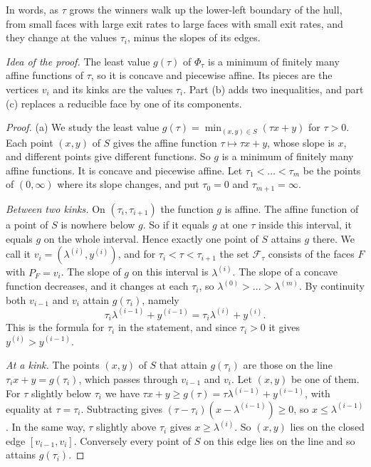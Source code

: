 In words, as $\tau$ grows the winners walk up the lower-left boundary of the
hull, from small faces with large exit rates to large faces with small exit
rates, and they change at the values $\tau_i$, minus the slopes of its edges.

\emph{Idea of the proof.} The least value $g(\tau)$ of $\Phi_\tau$ is a minimum
of finitely many affine functions of $\tau$, so it is concave and piecewise
affine. Its pieces are the vertices $v_i$ and its kinks are the values
$\tau_i$. Part (b) adds two inequalities, and part (c) replaces a reducible
face by one of its components.

\begin{proof}
(a) We study the least value $g(\tau)=\min_{(x,y)\in S}(\tau x+y)$ for $\tau>0$. Each point
$(x,y)$ of $S$ gives the affine function $\tau\mapsto\tau x+y$, whose slope is $x$, and different
points give different functions. So $g$ is a minimum of finitely many affine functions. It is
concave and piecewise affine. Let $\tau_1<\dots<\tau_m$ be the points of $(0,\infty)$ where its
slope changes, and put $\tau_0=0$ and $\tau_{m+1}=\infty$.

\emph{Between two kinks.} On $(\tau_i,\tau_{i+1})$ the function $g$ is affine. The affine
function of a point of $S$ is nowhere below $g$. So if it equals $g$ at one $\tau$ inside this
interval, it equals $g$ on the whole interval. Hence exactly one point of $S$ attains $g$ there.
We call it $v_i=(\lambda^{(i)},y^{(i)})$, and for $\tau_i<\tau<\tau_{i+1}$ the set
$\mathcal F_\tau$ consists of the faces $F$ with $P_F=v_i$. The slope of $g$ on this interval is
$\lambda^{(i)}$. The slope of a concave function decreases, and it changes at each $\tau_i$, so
$\lambda^{(0)}>\dots>\lambda^{(m)}$. By continuity both $v_{i-1}$ and $v_i$ attain $g(\tau_i)$,
namely
\[
\tau_i\lambda^{(i-1)}+y^{(i-1)}=\tau_i\lambda^{(i)}+y^{(i)} .
\]
This is the formula for $\tau_i$ in the statement, and since $\tau_i>0$ it gives
$y^{(i)}>y^{(i-1)}$.

\emph{At a kink.} The points $(x,y)$ of $S$ that attain $g(\tau_i)$ are those on the line
$\tau_ix+y=g(\tau_i)$, which passes through $v_{i-1}$ and $v_i$. Let $(x,y)$ be one of them. For
$\tau$ slightly below $\tau_i$ we have $\tau x+y\ge g(\tau)=\tau\lambda^{(i-1)}+y^{(i-1)}$, with
equality at $\tau=\tau_i$. Subtracting gives $(\tau-\tau_i)(x-\lambda^{(i-1)})\ge0$, so
$x\le\lambda^{(i-1)}$. In the same way, $\tau$ slightly above $\tau_i$ gives
$x\ge\lambda^{(i)}$. So $(x,y)$ lies on the closed edge $[v_{i-1},v_i]$. Conversely every point of
$S$ on this edge lies on the line and so attains $g(\tau_i)$.


\end{proof}
